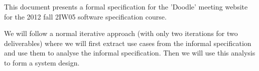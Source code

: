 This document presents a formal specification for the 'Doodle' meeting website for the 2012 fall 2IW05 software specification course.

We will follow a normal iterative approach (with only two iterations for two deliverables) where we will first extract use cases from the informal specification and use them to analyse the informal specification. Then we will use this analysis to form a system design.
